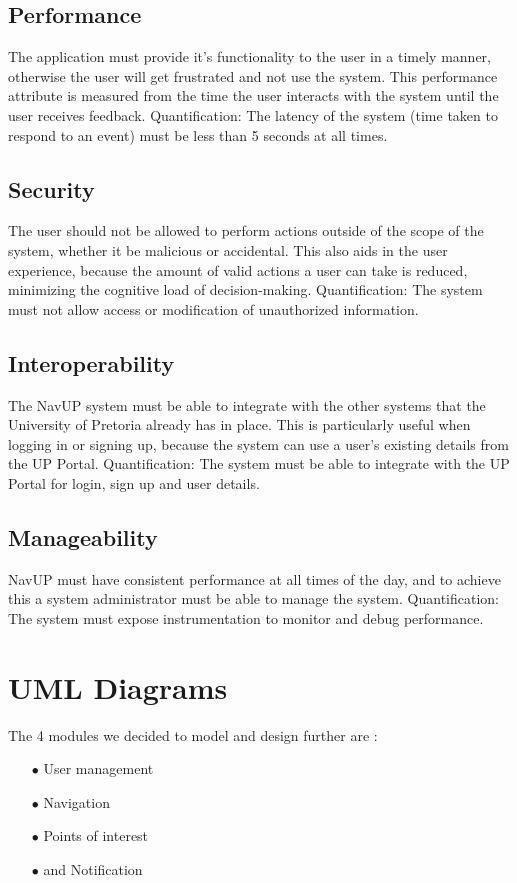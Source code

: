 \documentclass[english]{article}
\begin{document}
	\subsection{Performance}
	The application must provide it's functionality to the user in a timely manner, otherwise the user will get frustrated and not use the system. This performance attribute is measured from the time the user interacts with the system until the user receives feedback.
	\newline
	\newline
	{Quantification:} The latency of the system (time taken to respond to an event) must be less than 5 seconds at all times.
	\subsection{Security}
	The user should not be allowed to perform actions outside of the scope of the system, whether it be malicious or accidental. This also aids in the user experience, because the amount of valid actions a user can take is reduced, minimizing the cognitive load of decision-making.
	\newline
	\newline
	{Quantification:} The system must not allow access or modification of unauthorized information.
	\subsection{Interoperability}
	The NavUP system must be able to integrate with the other systems that the University of Pretoria already has in place. This is particularly useful when logging in or signing up, because the system can use a user's existing details from the UP Portal.
	\newline
	\newline
	{Quantification:} The system must be able to integrate with the UP Portal for login, sign up and user details.
	
	\subsection{Manageability}
	NavUP must have consistent performance at all times of the day, and to achieve this a system administrator must be able to manage the system.
	\newline
	\newline
	{Quantification:} The system must expose instrumentation to monitor and debug performance.
	
	\section{UML Diagrams}
	The 4 modules we decided to model and design further are :
	\begin{itemize}
		\item[$\bullet$] User management
		\item[$\bullet$] Navigation
		\item[$\bullet$] Points of interest
		\item[$\bullet$] and Notification
	\end{itemize}
		\clearpage
		
\end{document}
